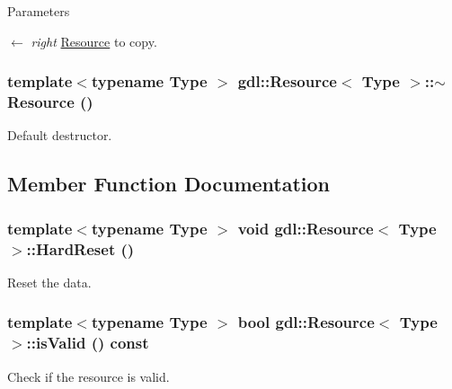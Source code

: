 \begin{DoxyParams}{Parameters}
\item[\mbox{$\leftarrow$} {\em right}]\hyperlink{classgdl_1_1Resource}{Resource} to copy. \end{DoxyParams}
\hypertarget{classgdl_1_1Resource_a52f5853b3028356acb3cfe8673fa4bd3}{
\subsubsection[{$\sim$Resource}]{\setlength{\rightskip}{0pt plus 5cm}template$<$typename Type $>$ {\bf gdl::Resource}$<$ Type $>$::$\sim${\bf Resource} ()}}
\label{classgdl_1_1Resource_a52f5853b3028356acb3cfe8673fa4bd3}
Default destructor. 

\subsection{Member Function Documentation}
\hypertarget{classgdl_1_1Resource_a62cfa0d7b8f63c2d6be09a644e49028c}{
\subsubsection[{HardReset}]{\setlength{\rightskip}{0pt plus 5cm}template$<$typename Type $>$ void {\bf gdl::Resource}$<$ Type $>$::HardReset ()}}
\label{classgdl_1_1Resource_a62cfa0d7b8f63c2d6be09a644e49028c}
Reset the data. \hypertarget{classgdl_1_1Resource_a3d8b62b778b5c598ee51a5edcdae05ef}{
\subsubsection[{isValid}]{\setlength{\rightskip}{0pt plus 5cm}template$<$typename Type $>$ bool {\bf gdl::Resource}$<$ Type $>$::isValid () const}}
\label{classgdl_1_1Resource_a3d8b62b778b5c598ee51a5edcdae05ef}
Check if the resource is valid.

